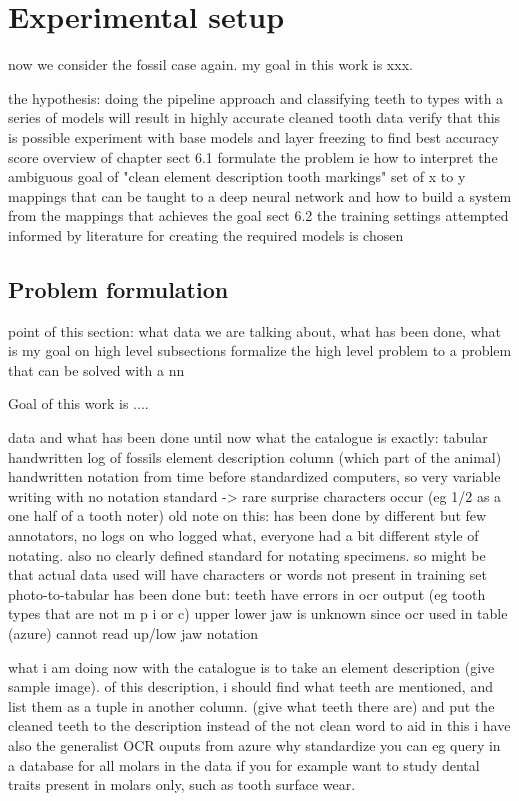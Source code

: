 \documentclass{article}
\begin{document}
\section{Experimental setup}

now we consider the fossil case again.
my goal in this work is xxx.

the hypothesis: doing the pipeline approach and classifying teeth to types with a series of models will result in highly accurate cleaned tooth data
    verify that this is possible
    experiment with base models and layer freezing to find best accuracy score
overview of chapter
    sect 6.1 formulate the problem ie how to interpret the ambiguous goal of 
    "clean element description tooth markings" set of x to y mappings that can be taught to a deep neural network
    and how to build a system from the mappings that achieves the goal
    sect 6.2 the training settings attempted informed by literature
    for creating the required models is chosen

\subsection{Problem formulation}

point of this section:
what data we are talking about, what has been done, what is my goal on high level 
subsections formalize the high level problem to a problem that can be solved with a nn

Goal of this work is ....

data and what has been done until now
what the catalogue is exactly: tabular handwritten log of fossils
element description column (which part of the animal)
    handwritten notation from time before standardized computers, so very variable writing with no notation standard
        -> rare surprise characters occur (eg 1/2 as a one half of a tooth noter)
            old note on this: has been done by different but few annotators, no logs on who logged what, everyone 
            had a bit different style of notating. also no clearly defined standard 
            for notating specimens. so might be that actual data used will have 
            characters or words not present in training set
photo-to-tabular has been done but:
    teeth have errors in ocr output (eg tooth types that are not m p i or c)
    upper lower jaw is unknown since ocr used in table (azure) cannot read up/low jaw notation

what i am doing now
with the catalogue is to take an element description (give sample image).
of this description, i should find what teeth are mentioned, and list them as a tuple 
in another column. (give what teeth there are) and put the cleaned teeth to 
the description instead of the not clean word
to aid in this i have also the generalist OCR ouputs from azure
why standardize
    you can eg query in a database for all molars in the data 
    if you for example want to study dental traits present in molars only, such as tooth surface wear.
\end{document}
